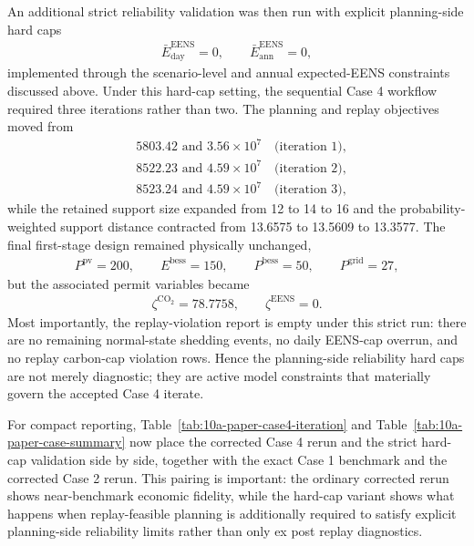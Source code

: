 An additional strict reliability validation was then run with explicit planning-side hard caps
\begin{align}
\bar E^{\mathrm{EENS}}_{\mathrm{day}} = 0, \qquad \bar E^{\mathrm{EENS}}_{\mathrm{ann}} = 0,
\end{align}
implemented through the scenario-level and annual expected-EENS constraints discussed above. Under this hard-cap setting, the sequential Case 4 workflow required three iterations rather than two. The planning and replay objectives moved from
\begin{align}
&5803.42 \text{ and } 3.56\times 10^7 \quad \text{(iteration 1)},\\
&8522.23 \text{ and } 4.59\times 10^7 \quad \text{(iteration 2)},\\
&8523.24 \text{ and } 4.59\times 10^7 \quad \text{(iteration 3)},
\end{align}
while the retained support size expanded from 12 to 14 to 16 and the probability-weighted support distance contracted from 13.6575 to 13.5609 to 13.3577. The final first-stage design remained physically unchanged,
\begin{align}
P^{\mathrm{pv}}=200,\qquad E^{\mathrm{bess}}=150,\qquad P^{\mathrm{bess}}=50,\qquad P^{\mathrm{grid}}=27,
\end{align}
but the associated permit variables became
\begin{align}
\zeta^{\mathrm{CO_2}} = 78.7758,\qquad \zeta^{\mathrm{EENS}} = 0.
\end{align}
Most importantly, the replay-violation report is empty under this strict run: there are no remaining normal-state shedding events, no daily EENS-cap overrun, and no replay carbon-cap violation rows. Hence the planning-side reliability hard caps are not merely diagnostic; they are active model constraints that materially govern the accepted Case 4 iterate.

For compact reporting, Table~\ref{tab:10a-paper-case4-iteration} and Table~\ref{tab:10a-paper-case-summary} now place the corrected Case 4 rerun and the strict hard-cap validation side by side, together with the exact Case 1 benchmark and the corrected Case 2 rerun. This pairing is important: the ordinary corrected rerun shows near-benchmark economic fidelity, while the hard-cap variant shows what happens when replay-feasible planning is additionally required to satisfy explicit planning-side reliability limits rather than only ex post replay diagnostics.



